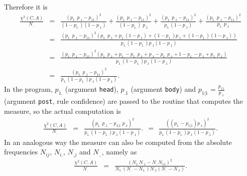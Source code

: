 \documentclass[a4paper]{article}
\begin{document}
Therefore it is
\begin{eqnarray*}
\frac{\chi^2(C,A)}{N_{..}}
& = & \frac{(p_{1.}\;p_{.1} -p_{11})^2}{(1 -p_{1.})(1 -p_{.1})}
  +   \frac{(p_{1.}\;p_{.1} -p_{11})^2}{(1 -p_{1.})\;p_{.1}}
  +   \frac{(p_{1.}\;p_{.1} -p_{11})^2}{p_{1.}(1 -p_{.1})}
  +   \frac{(p_{1.}\;p_{.1} -p_{11})^2}{p_{1.}\;p_{.1}} \\
& = & \frac{(p_{1.}\;p_{.1} -p_{11})^2
            (p_{1.}\;p_{.1}
            +p_{1.}(1 -p_{.1})
            +(1 -p_{1.})p_{.1}
            +(1 -p_{1.})(1 -p_{.1}))}
           {p_{1.}(1 -p_{1.})p_{.1}(1 -p_{.1})} \\
& = & \frac{(p_{1.}\;p_{.1} -p_{11})^2
            (p_{1.}\;p_{.1}
            +p_{1.} -p_{1.}\;p_{.1}
            +p_{.1} -p_{1.}\;p_{.1}
            +1 -p_{1.} -p_{.1} +p_{1.}\;p_{.1})}
           {p_{1.}(1 -p_{1.})p_{.1}(1 -p_{.1})} \\
& = & \frac{(p_{1.}\;p_{.1} -p_{11})^2}
           {p_{1.}(1 -p_{1.})p_{.1}(1 -p_{.1})}.
\end{eqnarray*}
In the program, $p_{1.}$ (argument {\tt head}), $p_{.1}$
(argument {\tt body}) and $p_{1|1} = \frac{p_{11}}{p_{.1}}$
(argument {\tt post}, rule confidence) are passed to the routine
that computes the measure, so the actual computation is
\begin{eqnarray*}
\frac{\chi^2(C,A)}{N_{..}}
& = & \frac{(p_{1.}\;p_{.1} -p_{1|1}\;p_{.1})^2}
           {p_{1.}(1 -p_{1.})p_{.1}(1 -p_{.1})}.
~~=~~ \frac{((p_{1.} -p_{1|1})p_{.1})^2}
           {p_{1.}(1 -p_{1.})p_{.1}(1 -p_{.1})}.
\end{eqnarray*}
In an analogous way the measure can also be computed from the absolute
frequencies $N_{ij}$, $N_{i.}$, $N_{.j}$ and $N_{..}$, namely as
\begin{eqnarray*}
\frac{\chi^2(C,A)}{N_{..}}
& = & \frac{(N_{1.}N_{.1} -N_{..}N_{11})^2}
           {N_{1.}(N_{..} -N_{1.})N_{.1}(N_{..} -N_{.1})}.
\end{eqnarray*}
\end{document}
